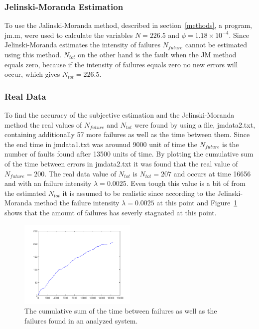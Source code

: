 \subsubsection*{Jelinski-Moranda Estimation}
To use the Jalinski-Moranda method, described in section~\ref{methods}, a program, jm.m, were used to calculate the variables $N=226.5$ and $\phi=1.18\times10^{-4}$. Since Jelinski-Moranda estimates the intensity of failures $N_{future}$ cannot be estimated using this method.
$N_{tot}$ on the other hand is the fault when the JM method equals zero, because if the intensity of failures equals zero no new errors will occur, which gives $N_{tot}=226.5$.

\subsubsection*{Real Data}
To find the accuracy of the subjective estimation and the Jelinski-Moranda method the real values of $N_{future}$ and $N_{tot}$ were found by using a file, jmdata2.txt, containing additionally 57 more failures as well as the time between them. Since the end time in jmdata1.txt was arounud 9000 unit of time the $N_{future}$ is the number of faults found after 13500 units of time. By plotting the cumulative sum of the time between errors in jmdata2.txt it was found that the real value of $N_{future}=200$. The real data value of $N_{tot}$ is $N_{tot}=207$ and occurs at time 16656 and with an failure intensity $\lambda=0.0025$. Even tough this value is a bit of from the estimated $N_{tot}$ it is assumed to be realistic since according to the Jelinski-Moranda method the failure intensity $\lambda=0.0025$ at this point and Figure~\ref{cumulativejmdata2} shows that the amount of failures has severly stagnated at this point.



\begin{figure}[htb!]
\begin{center}
	\includegraphics[width=0.5\textwidth]{cumsumjmdata2.png}
\caption{The cumulative sum of the time between failures as well as the failures found in an analyzed system.}
\end{center}
\label{cumulativejmdata2}
\end{figure}



